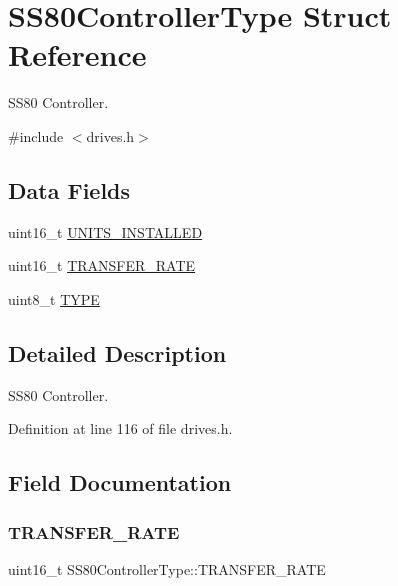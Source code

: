\hypertarget{structSS80ControllerType}{}\section{S\+S80\+Controller\+Type Struct Reference}
\label{structSS80ControllerType}


S\+S80 Controller.  




{\ttfamily \#include $<$drives.\+h$>$}

\subsection*{Data Fields}
\begin{DoxyCompactItemize}
\item 
uint16\+\_\+t \hyperlink{structSS80ControllerType_a0868c32b362ef2af2ac64fa16aee8aae}{U\+N\+I\+T\+S\+\_\+\+I\+N\+S\+T\+A\+L\+L\+ED}
\item 
uint16\+\_\+t \hyperlink{structSS80ControllerType_a98a3f1a7de63398531426b5781cb0090}{T\+R\+A\+N\+S\+F\+E\+R\+\_\+\+R\+A\+TE}
\item 
uint8\+\_\+t \hyperlink{structSS80ControllerType_a255739680bca0ad3b4d1346cf5017332}{T\+Y\+PE}
\end{DoxyCompactItemize}


\subsection{Detailed Description}
S\+S80 Controller. 

Definition at line 116 of file drives.\+h.



\subsection{Field Documentation}
\mbox{\label{structSS80ControllerType_a98a3f1a7de63398531426b5781cb0090}} 
\subsubsection{\texorpdfstring{T\+R\+A\+N\+S\+F\+E\+R\+\_\+\+R\+A\+TE}{TRANSFER\_RATE}}
{\footnotesize\ttfamily uint16\+\_\+t S\+S80\+Controller\+Type\+::\+T\+R\+A\+N\+S\+F\+E\+R\+\_\+\+R\+A\+TE}



